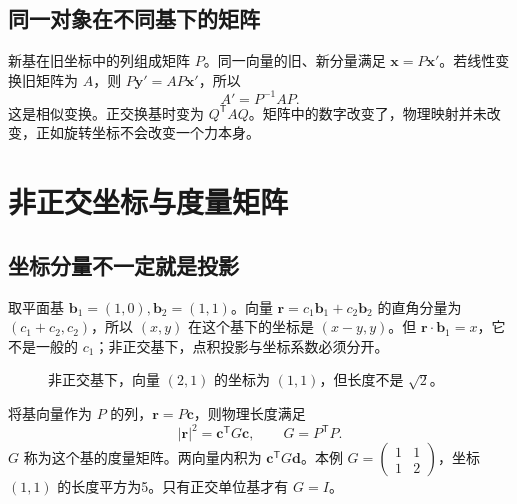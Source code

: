 \documentclass[11pt,openany,fontset=fandol]{ctexbook}
\theoremstyle{plain}\newtheorem{theorem}{定理}[chapter]\newtheorem{proposition}[theorem]{命题}
\theoremstyle{definition}\newtheorem{definition}{定义}[chapter]\newtheorem{example}{例}[chapter]
\theoremstyle{remark}\newtheorem*{remark}{说明}
\newcommand{\vct}[1]{\bm{#1}}\newcommand{\Rea}{\operatorname{Re}}\newcommand{\Ima}{\operatorname{Im}}
\begin{document}
\subsection{同一对象在不同基下的矩阵}
新基在旧坐标中的列组成矩阵 $P$。同一向量的旧、新分量满足 $\vct x=P\vct x'$。若线性变换旧矩阵为 $A$，则 $P\vct y'=AP\vct x'$，所以
\begin{equation}
A'=P^{-1}AP.
\end{equation}
这是相似变换。正交换基时变为 $Q^{\mathsf T}AQ$。矩阵中的数字改变了，物理映射并未改变，正如旋转坐标不会改变一个力本身。

\section{非正交坐标与度量矩阵}
\subsection{坐标分量不一定就是投影}
取平面基 $\vct b_1=(1,0),\vct b_2=(1,1)$。向量 $\vct r=c_1\vct b_1+c_2\vct b_2$ 的直角分量为 $(c_1+c_2,c_2)$，所以 $(x,y)$ 在这个基下的坐标是 $(x-y,y)$。但 $\vct r\cdot\vct b_1=x$，它不是一般的 $c_1$；非正交基下，点积投影与坐标系数必须分开。
\begin{figure}[htbp]\centering
{}
\caption{非正交基下，向量 $(2,1)$ 的坐标为 $(1,1)$，但长度不是 $\sqrt2$。}
\label{fig:orig-059}
\end{figure}

将基向量作为 $P$ 的列，$\vct r=P\vct c$，则物理长度满足
\[
|\vct r|^2=\vct c^{\mathsf T}G\vct c,\qquad G=P^{\mathsf T}P.
\]
$G$ 称为这个基的度量矩阵。两向量内积为 $\vct c^{\mathsf T}G\vct d$。本例 $G=\begin{pmatrix}1&1\\1&2\end{pmatrix}$，坐标 $(1,1)$ 的长度平方为5。只有正交单位基才有 $G=I$。
\end{document}
